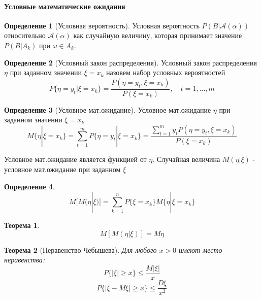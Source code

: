 \documentclass[a4paper]{article}
\newtheorem{theorem}{Теорема}[section]
\theoremstyle{definition}
\newtheorem*{definition}{Определение}
\theoremstyle{remark}
\begin{document}
\paragraph*{Условные математические ожидания}
\begin{definition}[Условная вероятность]
    Условная вероятность \(P(B|\mathscr{A}(\alpha))\) относительно \(\mathscr{A}(\alpha)\) как случайную величину, которая принимает значение \(P(B|A_k)\) при \(\omega \in A_k\).
\end{definition}
\begin{definition}[Условный закон распределения]
    Условный закон распределения $\eta $ при заданном значении $\xi = x_k$ назовем набор условных вероятностей
    \[P\{\eta = y_t | \xi = x_k\} = \frac{P(\eta = y_t, \xi = x_k)}{P(\xi = x_k)}, \quad t = 1, \dots, m\]
\end{definition}
\begin{definition}[Условное мат.ожидание]
    Условное мат.ожидание $\eta$ при заданном значении $\xi = x_k$
    \[M\{\eta | \xi = x_k\} = \sum_{t = 1}^{m} P\{\eta = y_t| \xi = x_k\} = \frac{\sum_{t = 1}^{m}y_t P(\eta = y_t, \xi = x_k)}{P(\xi = x_k)}\]
\end{definition}
Условное мат.ожидание является функцией от $\eta$. Случайная величина $M(\eta | \xi)$ - условное мат.ожидание при заданном $\xi$
\begin{definition}
    \[M[M(\eta | \xi)] = \sum_{k = 1}^{n} P\{\xi  = x_k\}M\{\eta | \xi = x_k\}\]
\end{definition}
\begin{theorem}
    \[M[M(\eta | \xi)] = M\eta\]
\end{theorem}
\begin{theorem}[Неравенство Чебышева]
    Для любого $x>0$ имеют место неравенства:
    \[P\{|\xi|\geq x\} \leq \frac{M|\xi|}{x}\]
    \[P\{|\xi - M\xi| \geq x\} \leq \frac{D \xi}{x^2}\]
\end{theorem}
\end{document}
